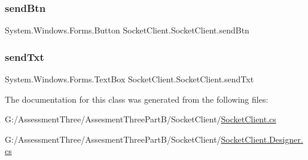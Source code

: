 \mbox{\label{class_socket_client_1_1_socket_client_ae39ef5159c71a2e983b6c19d3548622c}} 
\subsubsection{\texorpdfstring{send\+Btn}{sendBtn}}
{\footnotesize\ttfamily System.\+Windows.\+Forms.\+Button Socket\+Client.\+Socket\+Client.\+send\+Btn\hspace{0.3cm}{\ttfamily [private]}}

\mbox{\label{class_socket_client_1_1_socket_client_ae178c12147d21c828bb8a444267289ee}} 
\subsubsection{\texorpdfstring{send\+Txt}{sendTxt}}
{\footnotesize\ttfamily System.\+Windows.\+Forms.\+Text\+Box Socket\+Client.\+Socket\+Client.\+send\+Txt\hspace{0.3cm}{\ttfamily [private]}}



The documentation for this class was generated from the following files\+:\begin{DoxyCompactItemize}
\item 
G\+:/\+Assessment\+Three/\+Assesment\+Three\+Part\+B/\+Socket\+Client/\hyperlink{_socket_client_8cs}{Socket\+Client.\+cs}\item 
G\+:/\+Assessment\+Three/\+Assesment\+Three\+Part\+B/\+Socket\+Client/\hyperlink{_socket_client_8_designer_8cs}{Socket\+Client.\+Designer.\+cs}\end{DoxyCompactItemize}
